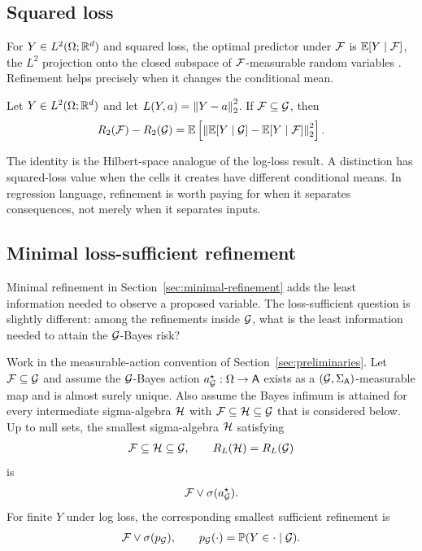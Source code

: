 \subsection{Squared loss}

For $Y\in L^2(\Omega;\mathbb{R}^d)$ and squared loss, the optimal predictor under $\mathcal{F}$ is $\operatorname*{\mathbb{E}}[Y\mid\mathcal{F}]$, the $L^2$ projection onto the closed subspace of $\mathcal{F}$-measurable random variables \citep{billingsley1995probability,kallenberg2002foundations}. Refinement helps precisely when it changes the conditional mean.

\begin{theorem}
\label{thm:squared-value:informal}
Let $Y\in L^2(\Omega;\mathbb{R}^d)$ and let $L(Y,a)=\left\lVert Y-a\right\rVert_2^2$. If $\mathcal{F}\subseteq\mathcal{G}$, then
\begin{align*}
R_2(\mathcal{F})-R_2(\mathcal{G})=\operatorname*{\mathbb{E}}\left[\left\lVert\operatorname*{\mathbb{E}}[Y\mid\mathcal{G}]-\operatorname*{\mathbb{E}}[Y\mid\mathcal{F}]\right\rVert_2^2\right].
\end{align*}
\end{theorem}

The identity is the Hilbert-space analogue of the log-loss result. A distinction has squared-loss value when the cells it creates have different conditional means. In regression language, refinement is worth paying for when it separates consequences, not merely when it separates inputs.

\subsection{Minimal loss-sufficient refinement}

Minimal refinement in Section~\ref{sec:minimal-refinement} adds the least information needed to observe a proposed variable. The loss-sufficient question is slightly different: among the refinements inside $\mathcal{G}$, what is the least information needed to attain the $\mathcal{G}$-Bayes risk?

\begin{theorem}
\label{thm:minimal-loss-sufficient:informal}
Work in the measurable-action convention of Section~\ref{sec:preliminaries}. Let $\mathcal{F}\subseteq\mathcal{G}$ and assume the $\mathcal{G}$-Bayes action $a_{\mathcal{G}}^\star:\Omega\to\mathsf A$ exists as a $(\mathcal{G},\Sigma_{\mathsf A})$-measurable map and is almost surely unique. Also assume the Bayes infimum is attained for every intermediate sigma-algebra $\mathcal{H}$ with $\mathcal{F}\subseteq\mathcal{H}\subseteq\mathcal{G}$ that is considered below. Up to null sets, the smallest sigma-algebra $\mathcal{H}$ satisfying
\begin{align*}
\mathcal{F}\subseteq\mathcal{H}\subseteq\mathcal{G},
\qquad
R_L(\mathcal{H})=R_L(\mathcal{G})
\end{align*}
is
\begin{align*}
\mathcal{F}\vee\sigma(a_{\mathcal{G}}^\star).
\end{align*}
For finite $Y$ under log loss, the corresponding smallest sufficient refinement is
\begin{align*}
\mathcal{F}\vee\sigma(p_{\mathcal{G}}),
\qquad
p_{\mathcal{G}}(\cdot)=\mathbb P(Y\in\cdot\mid\mathcal{G}).
\end{align*}
\end{theorem}

